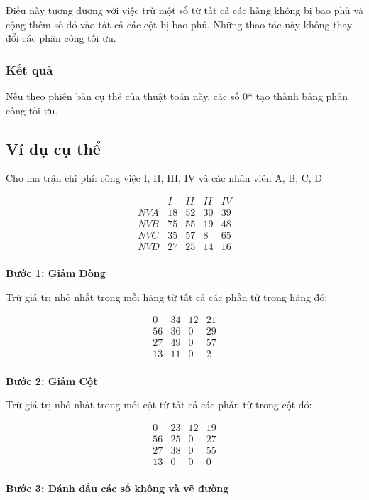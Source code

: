 Điều này tương đương với việc trừ một số từ tất cả các hàng không bị bao phủ và cộng thêm số đó vào tất cả các cột bị bao phủ. Những thao tác này không thay đổi các phân công tối ưu.


\subsubsection*{Kết quả}

Nếu theo phiên bản cụ thể của thuật toán này, các số 0* tạo thành bảng phân công tối ưu.

\subsection*{Ví dụ cụ thể}
Cho ma trận chi phí: công việc I, II, III, IV và các nhân viên A, B, C, D

\[
\begin{array}{ccccc}
&I&II&II&IV\\
NV A&18 & 52 & 30 & 39 \\
NV B&75 & 55 & 19 & 48 \\
NV C&35 & 57 & 8 & 65 \\
NV D&27 & 25 & 14 & 16 \\
\end{array}
\]

\textbf{Bước 1: Giảm Dòng}


Trừ giá trị nhỏ nhất trong mỗi hàng từ tất cả các phần tử trong hàng đó:

\[
\begin{array}{cccc}
0 & 34 & 12 & 21 \\
56 & 36 & 0 & 29 \\
27 & 49 & 0 & 57 \\
13 & 11 & 0 & 2 \\
\end{array}
\]

\textbf{Bước 2: Giảm Cột}

Trừ giá trị nhỏ nhất trong mỗi cột từ tất cả các phần tử trong cột đó:

\[
\begin{array}{cccc}
0 & 23 & 12 & 19 \\
56 & 25 & 0 & 27 \\
27 & 38 & 0 & 55 \\
13 & 0 & 0 & 0 \\
\end{array}
\]

\textbf{Bước 3: Đánh dấu các số không và vẽ đường}

